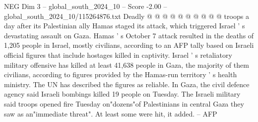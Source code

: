 \begin{textsample}{NEG Dim 3 – global\_south\_2024\_10 – Score -2.00 – global\_south\_2024\_10/115264876.txt}
Deadly @ @ @ @ @ @ @ @ @ @ troops a day after its Palestinian ally Hamas staged its attack, which triggered Israel ' s devastating assault on Gaza.
Hamas ' s October 7 attack resulted in the deaths of 1,205 people in Israel, mostly civilians, according to an AFP tally based on Israeli official figures that include hostages killed in captivity.
Israel ' s retaliatory military offensive has killed at least 41,638 people in Gaza, the majority of them civilians, according to figures provided by the Hamas-run territory ' s health ministry.
The UN has described the figures as reliable.
In Gaza, the civil defence agency said Israeli bombings killed 19 people on Tuesday.
The Israeli military said troops opened fire Tuesday on"dozens"of Palestinians in central Gaza they saw as an"immediate threat".
At least some were hit, it added. -- AFP

\end{textsample}
